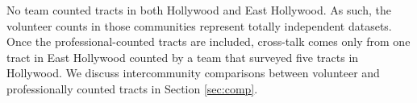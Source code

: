 \documentclass[11pt,twocolumn]{article}
\begin{document}


No team counted tracts in both Hollywood and East Hollywood. As such, the volunteer counts
in those communities represent totally independent datasets. Once the professional-counted tracts are 
included, cross-talk comes only from one tract in East Hollywood counted by a team that surveyed five 
tracts in Hollywood. We discuss intercommunity comparisons between volunteer and professionally 
counted tracts in Section \ref{sec:comp}.
\end{document}
